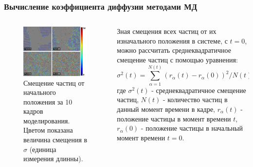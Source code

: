 \documentclass[pdf,hyperref={unicode}]{beamer}
\begin{document}
\begin{frame}
\transdissolve[duration=0.2]
\frametitle{Вычисление коэффициента диффузии методами МД}

\begin{columns}

\begin{column}{0.6\linewidth}

\begin{figure}[h]
\begin{center}
\includegraphics[width=\textwidth]{Diffusion}
\caption{\tiny Смещение частиц от начального положения за 10 кадров моделирования. Цветом показана величина смещения в $\sigma$ (единица измерения длинны).}
\label{risTreck}
\end{center}
\end{figure}

\end{column}
\begin{column}{0.5\linewidth}
\tiny{

Зная смещения всех частиц от их изначального положения в системе, с $t = 0$, можно рассчитать среднеквадратичное смещение частиц с помощью уравнения:
\begin{equation}
    \sigma^2(t) = \sum\limits_{\alpha = 1}^{N(t)} (r_{\alpha}(t) - r_{\alpha}(0))^2 / N(t),
    \label{eqRMS}
\end{equation}
где $\sigma^2(t)$ - среднеквадратичное смещение частиц, $N(t)$ - количество частиц в данный момент времени в кадре, $r_{\alpha}(t)$ - положение частицы в момент времени $t$, $r_{\alpha}(0)$ - положение частицы в начальный момент времени $t = 0$.

}
\end{column}

\end{columns}
\end{frame}
\end{document}
